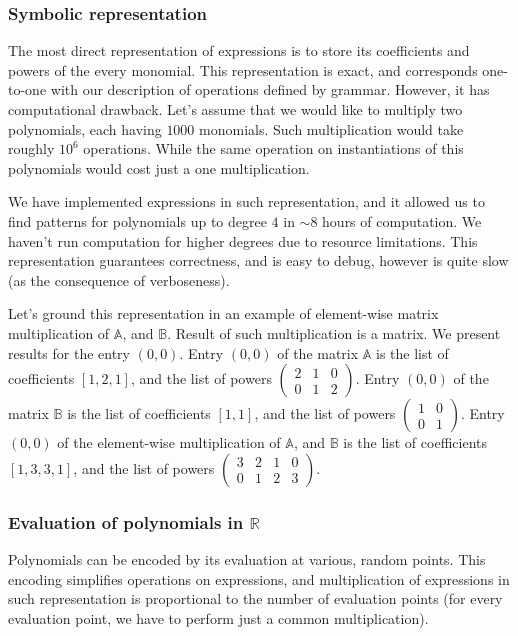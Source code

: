 \subsubsection{Symbolic representation}
The most direct representation of expressions is to store its coefficients and powers of the every monomial.
This representation is exact, and corresponds one-to-one with our description of operations
defined by grammar. However, it has computational drawback. 
Let's assume that we would like to multiply two polynomials, each having $1000$ monomials.
Such multiplication would take roughly $10^6$ operations. While the same operation on instantiations of
this polynomials would cost just a one multiplication.


We have implemented expressions in such representation, and it allowed us
to find patterns for polynomials up to degree $4$ in $\sim 8$ hours of computation. We haven't run computation for 
higher degrees due to resource limitations. This representation guarantees correctness, and is easy to debug, however
is quite slow (as the consequence of verboseness). 

Let's ground this representation in an example of element-wise matrix multiplication of $\mathbb{A}$, and $\mathbb{B}$.
Result of such multiplication is a matrix. We present results for the entry $(0, 0)$.
Entry $(0, 0)$ of the matrix $\mathbb{A}$ is the list of coefficients $[1, 2, 1]$, and the list
of powers $\begin{pmatrix} 2 & 1 & 0\\ 0 & 1 & 2 \end{pmatrix}$. Entry $(0, 0)$ of the matrix $\mathbb{B}$ is
the list of coefficients $[1, 1]$, and the list of powers 
$\begin{pmatrix} 1 & 0 \\ 0 & 1 \end{pmatrix}$. Entry $(0, 0)$ of the element-wise multiplication of $\mathbb{A}$, and $\mathbb{B}$
is the list of coefficients $[1, 3, 3, 1]$, and
the list of powers $\begin{pmatrix} 3 & 2 & 1 & 0 \\ 0 & 1 & 2 & 3 \end{pmatrix}$. 


\subsubsection{Evaluation of polynomials in $\mathbb{R}$}
Polynomials can be encoded by its evaluation at various, random points.
This encoding simplifies operations on expressions, and multiplication of expressions
in such representation is proportional to the number of evaluation points (for every evaluation
point, we have to perform just a common multiplication).

